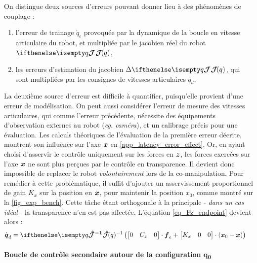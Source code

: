 \documentclass[12pt, a4paper]{article} %
\numberwithin{equation}{section}
\begin{document}
On distingue deux sources d'erreurs pouvant donner lieu à des phénomènes de couplage : 
\begin{enumerate}
	\item l'erreur de trainage $ \dot{q}_{\epsilon} $ provoquée par la dynamique de la boucle en vitesse articulaire du robot, et multipliée par le jacobien réel du robot $ \jacobian{q}{}{} $,
	\item les erreurs d'estimation du jacobien $ \Delta\jacobian{q}{}{} $, qui sont multipliées par les consignes de vitesses articulaires $ \dot{q_d} $.
\end{enumerate}
La deuxième source d'erreur est difficile à quantifier, puisqu'elle provient d'une erreur de modélisation. On peut aussi considérer l'erreur de mesure des vitesses articulaires, qui comme l'erreur précédente, nécessite des équipements d'observation externes au robot (\textit{eg. caméra}), et un calibrage précis pour une évaluation.
%
\newlineBlank
%
Les calculs théoriques de l'évaluation de la première erreur décrite, montrent son influence sur l'axe $ \vect{x} $ en \cref{app_latency_error_effect}. Or, en ayant choisi d'asservir le contrôle uniquement sur les forces en $ \vect{z} $, les forces exercées sur l'axe $ \vect{x} $ ne sont plus perçues par le contrôle en transparence. Il devient donc impossible de replacer le robot \textit{volontairement} lors de la co-manipulation.
%
\newlineBlank
%
Pour remédier à cette problématique, il suffit d'ajouter un asservissement proportionnel de gain $ K_x $ sur la position en $ \vect{x} $, pour maintenir la position $ x_0 $, comme montré sur la \cref{fig_exp_bench}. Cette tâche étant orthogonale à la principale - \textit{dans un cas idéal} - la transparence n'en est pas affectée. L'équation \cref{eq_Fz_endpoint} devient alors :
%
\begin{equation} \label{eq_Fz_endpoint_total}
	\begin{split}
	\dot{\vect{q}}_d &= \jacobianHat{q}{}{-1} \left(\begin{bmatrix} 0 & C_z & 0 \end{bmatrix} \cdot {\vect{f}_e} + \begin{bmatrix} K_x & 0 & 0 \end{bmatrix} \cdot (\vect{x}_0 - {\vect{x}})\right)
	\end{split}
\end{equation}

\paragraph{Boucle de contrôle secondaire autour de la configuration q\textsubscript{0}} \label{sec_robot_sub_ctrl_loop_sub_endpoint_par_q0}
\end{document}

